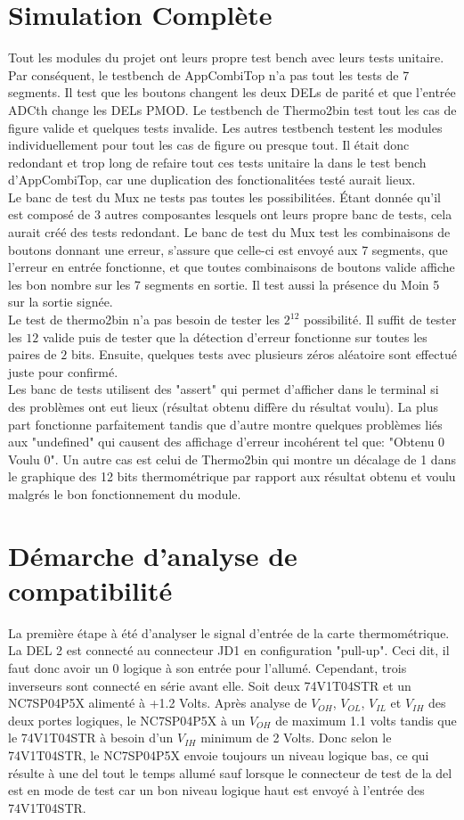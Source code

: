 \documentclass[a11paper]{article}
\begin{document}
\section{Simulation Complète}
Tout les modules du projet ont leurs propre test bench avec leurs tests unitaire. Par conséquent, le testbench de AppCombiTop n'a pas
tout les tests de 7 segments. Il test que les boutons changent les deux DELs de parité et que l'entrée ADCth change les DELs PMOD.
Le testbench de Thermo2bin test tout les cas de figure valide et quelques tests invalide. Les autres testbench testent les modules
individuellement pour tout les cas de figure ou presque tout. Il était donc redondant et trop long de refaire tout ces tests unitaire la
dans le test bench d'AppCombiTop, car une duplication des fonctionalitées testé aurait lieux.
\\
Le banc de test du Mux ne tests pas toutes les possibilitées. Étant donnée qu'il est composé de 3 autres composantes lesquels ont leurs
propre banc de tests, cela aurait créé des tests redondant. Le banc de test du Mux test les combinaisons de boutons donnant une erreur,
s'assure que celle-ci est envoyé aux 7 segments, que l'erreur en entrée fonctionne, et que toutes combinaisons de boutons valide affiche
les bon nombre sur les 7 segments en sortie. Il test aussi la présence du Moin 5 sur la sortie signée.
\\
Le test de thermo2bin n'a pas besoin de tester les $2^{12}$ possibilité. Il suffit de tester les $12$ valide puis de tester que la
détection d'erreur fonctionne sur toutes les paires de $2$ bits. Ensuite, quelques tests avec plusieurs zéros aléatoire sont effectué
juste pour confirmé.
\\
Les banc de tests utilisent des "assert" qui permet d'afficher dans le terminal si des problèmes ont eut lieux (résultat obtenu diffère
du résultat voulu). La plus part fonctionne parfaitement tandis que d'autre montre quelques problèmes liés aux "undefined" qui causent des
affichage d'erreur incohérent tel que: "Obtenu 0 Voulu 0". Un autre cas est celui de Thermo2bin qui montre un décalage de 1 dans le
graphique des 12 bits thermométrique par rapport aux résultat obtenu et voulu malgrés le bon fonctionnement du module.

\section{Démarche d'analyse de compatibilité}
La première étape à été d'analyser le signal d'entrée de la carte thermométrique. La DEL 2 est connecté au connecteur JD1 en
configuration "pull-up". Ceci dit, il faut donc avoir un 0 logique à son entrée pour l'allumé. Cependant, trois inverseurs sont
connecté en série avant elle. Soit deux 74V1T04STR et un NC7SP04P5X alimenté à +1.2 Volts. Après analyse de $V_{OH}$, $V_{OL}$, $V_{IL}$
et $V_{IH}$ des deux portes logiques, le NC7SP04P5X à un $V_{OH}$ de maximum 1.1 volts tandis que le 74V1T04STR à besoin d'un $V_{IH}$
minimum de 2 Volts. Donc selon le 74V1T04STR, le NC7SP04P5X envoie toujours un niveau logique bas, ce qui résulte à une del
tout le temps allumé sauf lorsque le connecteur de test de la del est en mode de test car un bon niveau logique haut est envoyé à
l'entrée des 74V1T04STR.


\end{document}

